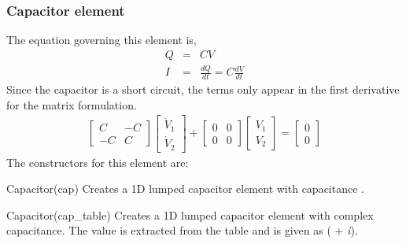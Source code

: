 \subsubsection*{Capacitor element}
The equation governing this element is,
\begin{eqnarray}
Q &=& CV  \\
I &=& \frac{dQ}{dt}= C\frac{dV}{dt}
\end{eqnarray}
Since the capacitor is a short circuit, the terms only appear in 
the first derivative for the matrix formulation.
\begin{eqnarray}
\left[
\begin{array}{rr}
C  & -C \\
-C & C
\end{array}
\right]
\left[
\begin{array}{c}
\dot{V}_1 \\
\dot{V}_2
\end{array}
\right]
+
\left[
\begin{array}{cc}
0  &  0 \\
0  &  0
\end{array}
\right]
\left[
\begin{array}{c}
{V}_1 \\
{V}_2
\end{array}
\right]
=
\left[
\begin{array}{c}
0 \\
0
\end{array}
\right]
\end{eqnarray}
The constructors for this element are:
\begin{codelist}

  \item[Capacitor(cap)]
  Creates a 1D lumped capacitor element with capacitance . 

  \item[Capacitor(cap\_table)]
  Creates a 1D lumped capacitor element
  with complex capacitance. The value is extracted from the table
   and is given as
  ( + {\it i}).

\end{codelist}

